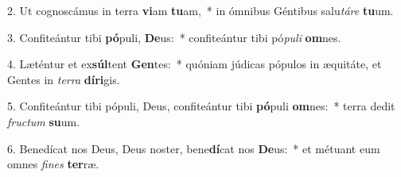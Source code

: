 2. Ut cognoscámus in terra \textbf{vi}am \textbf{tu}am,~*  in ómnibus Géntibus salu\textit{tá}\textit{re} \textbf{tu}um.\

3. Confiteántur tibi \textbf{pó}puli, \textbf{De}us:~*  confiteántur tibi pó\textit{pu}\textit{li} \textbf{om}nes.\

4. Læténtur et ex\textbf{súl}tent \textbf{Gen}tes:~*  quóniam júdicas pópulos in æquitáte, et Gentes in \textit{ter}\textit{ra} \textbf{dí}\textbf{ri}gis.\

5. Confiteántur tibi pópuli, Deus, confiteántur tibi \textbf{pó}puli \textbf{om}nes:~*  terra dedit \textit{fruc}\textit{tum} \textbf{su}um.\

6. Benedícat nos Deus, Deus noster, bene\textbf{dí}cat nos \textbf{De}us:~*  et métuant eum omnes \textit{fi}\textit{nes} \textbf{ter}ræ.\

